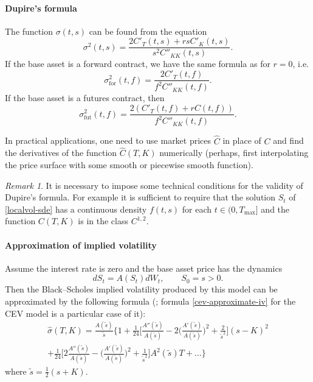 \documentclass[a4paper,11pt,titlepage]{article}
\renewcommand{\hat}{\widehat}
\renewcommand{\tilde}{\widetilde}
\theoremstyle{remark}
\newtheorem{remark}{Remark}
\begin{document}
\paragraph{Dupire's formula \citep{Dupire94}} 
The function $\sigma(t,s)$ can be found from the equation
\[
\sigma^2(t,s) = \frac{2 C'_T(t,s) + rs C'_K(t,s)}{s^2 C''_{KK}(t,s)}.
\]
If the base asset is a forward contract, we have the same formula as for
$r=0$, i.e.
\[
\sigma^2_{\mathrm{for}}(t,f) = \frac{2C'_T(t,f)}{f^2 C''_{KK}(t,f)}.
\]
If the base asset is a futures contract, then
\[
\sigma^2_{\mathrm{fut}}(t,f) = 
\frac{2(C'_T(t,f) + r C(t,f))}{f^2 C''_{KK}(t,f)}.
\]

In practical applications, one need to use market prices $\hat C$ in place of
$C$ and find the derivatives of the function $\hat C(T,K)$ numerically
(perhaps, first interpolating the price surface with some smooth or piecewise
smooth function).

\begin{remark} 
It is necessary to impose some technical conditions for the validity of
Dupire's formula. For example it is sufficient to require that the solution
$S_t$ of \eqref{localvol-sde} has a continuous density $f(t,s)$ for each
$t\in(0,T_{\max}]$ and the function $C(T,K)$ is in the class $C^{1,2}$.
\end{remark}


\paragraph{Approximation of implied volatility} Assume the interest rate is
zero and the base asset price has the dynamics
\[
dS_t = A(S_t) dW_t, \qquad S_0 = s > 0.
\]
Then the Black--Scholes implied volatility produced by this model can be
approximated by the following formula (\cite{HaganWoodward99}; formula
\eqref{cev-approximate-iv} for the CEV model is a particular case of it):
\begin{multline*}
\hat\sigma(T,K) = \frac{ A(\tilde s)}{\tilde s} 
\biggl\{ 1 + \frac1{24} 
  \biggl[ 
     \frac{A''(\tilde s)}{A(\tilde s)} -
     2\biggl( \frac{A'(\tilde s)}{A(\tilde s)} \biggr)^2 + \frac{2}{\tilde s^2}
  \biggr] (s-K)^2 \\ + 
  \frac{1}{24} 
  \biggl[ 
     2\frac{A''(\tilde s)}{A(\tilde s)} - 
     \biggl( \frac{A'(\tilde s)}{A(\tilde s)} \biggr)^2 + 
    \frac{1}{\tilde s^2}
  \biggr]  A^2(\tilde s)T + \ldots
\biggl\}
\end{multline*}
where $\tilde s = \frac12(s+K)$. 
\end{document}
